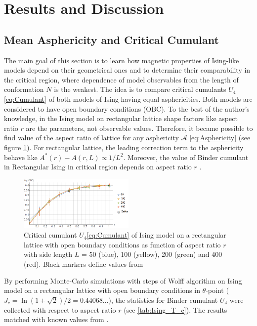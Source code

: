 \section{Results and Discussion}
\label{sec:res}
\subsection{Mean Asphericity and Critical Cumulant}

The main goal of this section is to learn how magnetic properties of Ising-like models depend on their geometrical ones and to determine their comparability in the critical region, where dependence of model observables from the length of conformation $N$ is the weakest. 
The idea is to compare critical cumulants $U_{4}$ \eqref{eq:Cumulant} of both models of Ising having equal asphericities. 
Both models are considered to have open boundary conditions (OBC). 
To the best of the author’s knowledge, in the Ising model on rectangular lattice shape factors like aspect ratio $r$ are the parameters, not observable values. 
Therefore, it became possible to find value of the aspect ratio of lattice for any asphericity $\mathcal{A}$ \eqref{eq:Asphericity} (see figure \ref{fig:A_r}). 
For rectangular lattice, the leading correction term to the asphericity behave like $A^{*}(r) - A(r, L) \propto 1 / L^{2}$. 
Moreover, the value of Binder cumulant in Rectangular Ising in critical region depends on aspect ratio $r$ \cite{Selke2006}.

\begin{figure}[h]
    \centering
    \includegraphics[width=0.5\textwidth]{Images/CumulantOBC.png}
    \caption{Critical cumulant $U_{4}$\eqref{eq:Cumulant} of Ising model on a rectangular lattice with open boundary conditions as function of aspect ratio $r$ with side length $L$ = 50 (blue), 100 (yellow), 200 (green) and 400 (red). Black markers define values from \cite{Selke2006}}
    \label{fig:A_r}
\end{figure} 

By performing Monte-Carlo simulations with steps of Wolff algorithm \cite{Newmanb1999} on Ising model on a rectangular lattice with open boundary conditions in $\theta$-point ($J_{c} = \ln{(1 + \sqrt{2}) / 2} =  0.44068... $), the statistics for Binder cumulant $U_{4}$ were collected with respect to aspect ratio $r$ (see \cref{tab:Ising_T_c}). The results matched with known values from \cite{Selke2006}.

